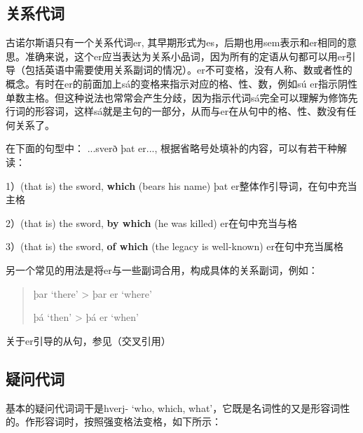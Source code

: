 \subsection{关系代词}\label{ux5173ux7cfbux4ee3ux8bcd}

古诺尔斯语只有一个关系代词er,
其早期形式为es，后期也用sem表示和er相同的意思。准确来说，这个er应当表达为关系小品词，因为所有的定语从句都可以用er引导（包括英语中需要使用关系副词的情况）。er不可变格，没有人称、数或者性的概念。有时在er的前面加上sá的变格来指示对应的格、性、数，例如sú
er指示阴性单数主格。但这种说法也常常会产生分歧，因为指示代词sá完全可以理解为修饰先行词的形容词，这样sá就是主句的一部分，从而与er在从句中的格、性、数没有任何关系了。

在下面的句型中： ...sverð þat er...,
根据省略号处填补的内容，可以有若干种解读：

1）(that is) the sword, \textbf{which} (bears his name)‌ þat
er整体作引导词，在句中充当主格

2）(that is) the sword, \textbf{by which} (he was killed)‌
er在句中充当与格

3）(that is) the sword, \textbf{of which} (the legacy is well-known)‌
er在句中充当属格

另一个常见的用法是将er与一些副词合用，构成具体的关系副词，例如：

\begin{quote}
  þar `there‌' \textgreater{} þar er `where‌'

  þá `then‌' \textgreater{} þá er `when‌'
\end{quote}

关于er引导的从句，参见（交叉引用）

\subsection{疑问代词}\label{ux7591ux95eeux4ee3ux8bcd}

基本的疑问代词词干是hverj- `who, which,
what‌'，它既是名词性的又是形容词性的。作形容词时，按照强变格法变格，如下所示：

